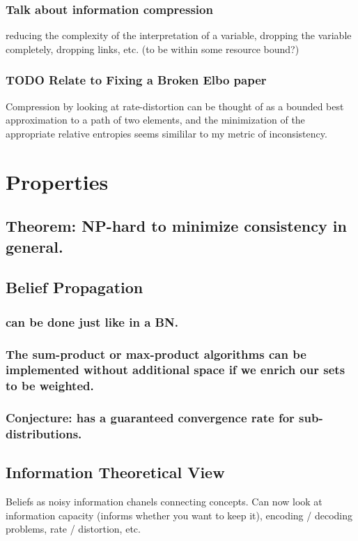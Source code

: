 \documentclass[11pt]{article}
\begin{document}
\subsubsection{Talk about information compression}
\label{sec:org941d81c}
reducing the complexity of the interpretation of a variable, dropping the variable completely, dropping links, etc. (to be within some resource bound?)

\subsubsection{{\bfseries\sffamily TODO} Relate to Fixing a Broken Elbo paper}
\label{sec:orgaf2510c}
Compression by looking at rate-distortion can be thought of as a bounded best approximation to a path of two elements, and the minimization of the appropriate relative entropies seems simililar to my metric of inconsistency.

\section{Properties}
\label{sec:orgc9a0782}

\subsection{Theorem: NP-hard to minimize consistency in general.}
\label{sec:org04b205d}

\subsection{Belief Propagation}
\label{sec:orgd277982}
\subsubsection{can be done just like in a BN.}
\label{sec:orgc7ce18a}
\subsubsection{The sum-product or max-product algorithms can be implemented without additional space if we enrich our sets to be weighted.}
\label{sec:orgac96580}
\subsubsection{Conjecture: has a guaranteed convergence rate for sub-distributions.}
\label{sec:org15fe9ba}

\subsection{Information Theoretical View}
\label{sec:orga00c3c1}
Beliefs as noisy information chanels connecting concepts. Can now look at information capacity (informs whether you want to keep it), encoding / decoding problems, rate / distortion, etc.
\end{document}
